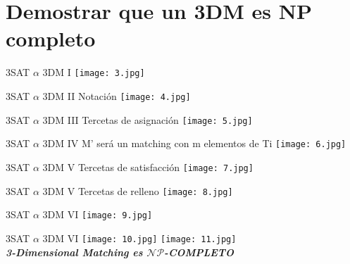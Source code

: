 \documentclass[10pt, mathserif, profesionalfont]{beamer}
\begin{document}
\section{Demostrar que un 3DM es NP completo}
\begin{frame}{3SAT $\alpha$ 3DM I}
    \texttt{[image: 3.jpg]}

\end{frame}

\begin{frame}{3SAT $\alpha$ 3DM II}
	Notación
    \texttt{[image: 4.jpg]}

\end{frame}
\begin{frame}{3SAT $\alpha$ 3DM III}
Tercetas de asignación
    \texttt{[image: 5.jpg]}

\end{frame}
\begin{frame}{3SAT $\alpha$ 3DM IV}
M' será un matching con m elementos de Ti
    \texttt{[image: 6.jpg]}

\end{frame}

\begin{frame}{3SAT $\alpha$ 3DM V}
Tercetas de satisfacción
    \texttt{[image: 7.jpg]}

\end{frame}
\begin{frame}{3SAT $\alpha$ 3DM V}
Tercetas de relleno
    \texttt{[image: 8.jpg]}

\end{frame}

\begin{frame}{3SAT $\alpha$ 3DM VI}
    \texttt{[image: 9.jpg]}
    
\end{frame}
\begin{frame}{3SAT $\alpha$ 3DM VI}
   \texttt{[image: 10.jpg]}
 \texttt{[image: 11.jpg]}
\\\textit{\textbf{3-Dimensional Matching es $\mathcal{NP}$-COMPLETO}}

\end{frame}
\end{document}
